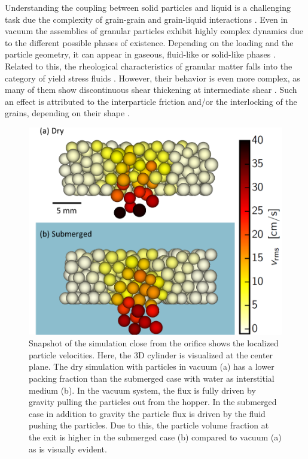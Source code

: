 \documentclass[twoside,twocolumn,9pt]{article}
\begin{document}
Understanding the coupling between solid particles and liquid is a challenging task due the complexity of grain-grain and grain-liquid interactions \cite{zhou2010discrete,zhu2007discrete}. Even in vacuum the assemblies of granular particles exhibit highly complex dynamics due to the different possible phases of existence. Depending on the loading and the particle geometry, it can appear in gaseous, fluid-like or solid-like phases \cite{Eshuis2007}. Related to this, the rheological characteristics of granular matter falls into the category of yield stress fluids \cite{Divoux2015,Johnson2017}. However, their behavior is even more complex, as many of them show discontinuous shear thickening at intermediate shear \cite{Seto2013}. Such an effect is attributed to the interparticle friction and/or the interlocking of the grains, depending on their shape \cite{LosertPRE00,Athanassiadis2014, Jaeger2014}.
%
\begin{figure}[!th]
\includegraphics[width=\columnwidth]{fig1-snapshot_sim.png}
\caption{\label{fig1}Snapshot of the simulation close from the orifice shows the localized particle velocities. Here, the 3D cylinder is visualized at the center plane. The dry simulation with particles in vacuum (a) has a lower packing fraction than the submerged case with water as interstitial medium (b). In the vacuum system, the flux is fully driven by gravity pulling the particles out from the hopper. In the submerged case in addition to gravity the particle flux is driven by the fluid pushing the particles. Due to this, the particle volume fraction at the exit is higher in the submerged case (b) compared to vacuum (a) as is visually evident.}
\end{figure}
\end{document}
